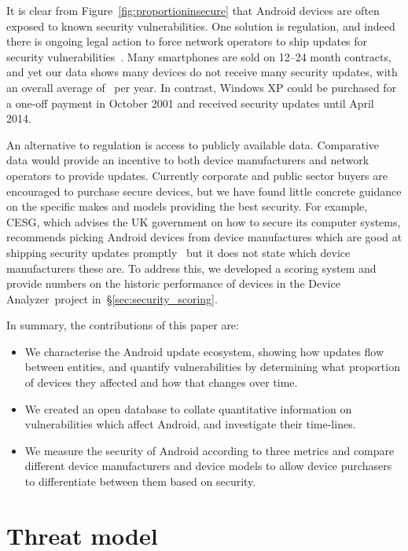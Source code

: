 \documentclass[conference,a4paper,twoside]{IEEEtran}
\let\OldTodo\todo
\renewcommand{\todo}{\OldTodo[inline]}
\newcommand{\todolater}[1]{}%
\newcommand{\da}{Device Analyzer}
\begin{document}
It is clear from Figure~\ref{fig:proportioninsecure} that Android devices are often exposed to known security vulnerabilities.
One solution is regulation, and indeed there is ongoing legal action to force network operators to ship updates for security vulnerabilities~\cite{Soghoian2013}.\todolater{Check on the status of this legal action}
Many smartphones are sold on 12--24 month contracts, and yet our data shows many devices do not receive many security updates, with an overall average of \daUpdatesPerYearNominal\ per year. 
In contrast, Windows XP could be purchased for a one-off payment in October 2001 and received security updates until April 2014.

An alternative to regulation is access to publicly available data. 
Comparative data would provide an incentive to both device manufacturers and network operators to provide updates.
Currently corporate and public sector buyers are encouraged to purchase secure devices, but we have found little concrete guidance on the specific makes and models providing the best security. 
For example, CESG, which advises the UK government on how to secure its computer systems, recommends picking Android devices from device manufactures which are good at shipping security updates promptly~\cite{CESG2013} but it does not state which device manufacturers these are.
To address this, we developed a scoring system and provide numbers on the historic performance of devices in the \da\ project in~\S\ref{sec:security_scoring}.

In summary, the contributions of this paper are:
\begin{itemize}
 \item We characterise the Android update ecosystem, showing how updates flow between entities, and quantify vulnerabilities by determining what proportion of devices they affected and how that changes over time.
 \item We created an open database to collate quantitative information on vulnerabilities which affect Android, and investigate their time-lines.
 \item We measure the security of Android according to three metrics and compare different device manufacturers and device models to allow device purchasers to differentiate between them based on security.
\end{itemize}

\section{Threat model}
\label{sec:threatmodel}
\end{document}
